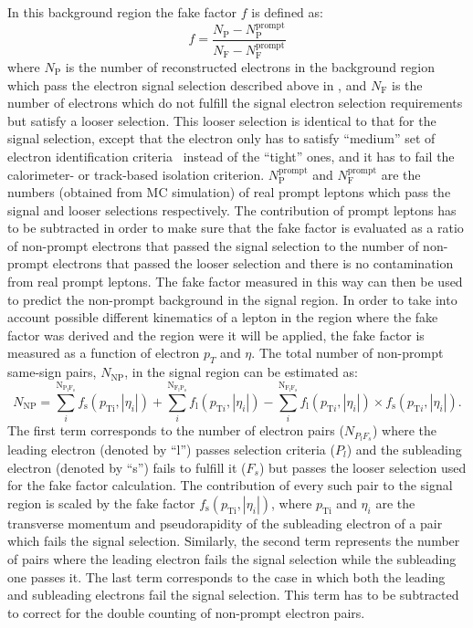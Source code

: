 In this background region the fake factor $f$ is defined as:
\begin{equation}
f = \frac{N_{\mathrm{P}} - N_{\mathrm{P}}^{\mathrm{prompt}}}{N_{\mathrm{F}}  - N_{\mathrm{F}}^{\mathrm{prompt}}}
\label{eq:fakefactor}
\end{equation}
where $N_{\mathrm{P}}$ is the number of reconstructed electrons in the background region which pass the electron signal selection
described above in , and $N_{\mathrm{F}}$ is the number of electrons which do not fulfill the 
signal electron selection requirements but satisfy a looser selection. This looser selection is identical to that for the signal selection, except 
that the electron only has to satisfy ``medium'' set of electron identification criteria~\cite{electron_tight} instead of the ``tight'' ones,
and it has to fail the calorimeter- or track-based isolation criterion.
$N_{\mathrm{P}}^{\mathrm{prompt}}$ and $N_{\mathrm{F}}^{\mathrm{prompt}}$ are the numbers (obtained from MC simulation) of real prompt
leptons which pass the signal and looser selections respectively.
The contribution of prompt leptons has to be subtracted in order to make sure that 
the fake factor is evaluated as a ratio of non-prompt electrons that passed the signal selection to
the number of non-prompt electrons that passed the looser selection and there is no contamination from real prompt leptons.
The fake factor measured in this way can then be used to predict the non-prompt background in the signal region.
In order to take into account possible different kinematics of a lepton in the region where the fake factor was derived 
and the region were it will be applied, the fake factor is measured as a function of electron $p_T$ and $\eta$.
The total number of non-prompt same-sign pairs, $N_{\mathrm{NP}}$, in the signal region can be estimated as:
\begin{equation}
N_{\mathrm{NP}} = \sum_{i}^{\mathrm{N_{P_l F_s}}} f_{\mathrm{s}}(p_{\mathrm{Ti}},|\eta_{i}|) + \sum_{i}^{\mathrm{N_{F_l P_s}}} f_{\mathrm{l}}(p_{\mathrm{T}i},|\eta_{i}|) - \sum_{i}^{\mathrm{N_{F_l F_s}}} f_{\mathrm{l}}(p_{\mathrm{T}i},|\eta_{i}|) \times f_{\mathrm{s}}(p_{\mathrm{T}i},|\eta_{i}|)
\label{eq:fake_pred}.
\end{equation}
The first term corresponds to the number of electron pairs ($N_{P_l F_s}$) 
where the leading electron (denoted by ``l'') passes selection criteria ($P_l$) and the subleading electron (denoted by ``s'')
fails to fulfill it ($F_s$) but passes the looser selection used for the fake factor calculation. 
The contribution of every such pair to the signal region is scaled by the fake factor 
$f_{\mathrm{s}}(p_{\mathrm{Ti}},|\eta_{i}|)$, where $p_\mathrm{Ti}$ and $\eta_{i}$ are the transverse momentum and pseudorapidity
of the subleading electron of a pair which fails the signal selection. 
Similarly, the second term represents the number of pairs where
the leading electron fails the signal selection while the subleading one passes it. 
The last term corresponds to the case in which both the leading
and subleading electrons fail the signal selection. This term has to be subtracted to correct for the double
counting of non-prompt electron pairs.

